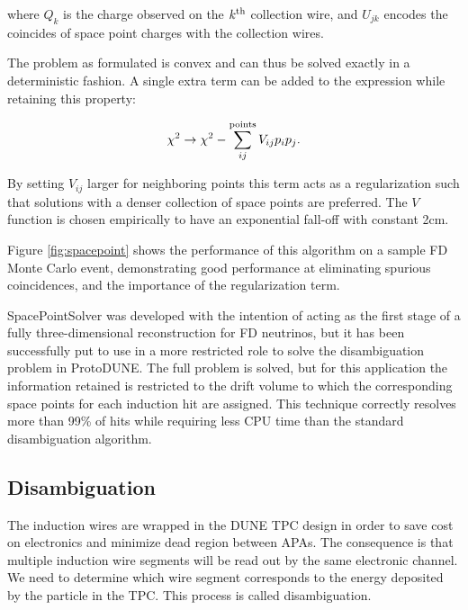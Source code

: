 where $Q_k$ is the charge observed on the $k^{\rm th}$ collection wire, and $U_{jk}$ encodes the coincides of space point charges with the collection wires.

The problem as formulated is convex and can thus be solved exactly in a deterministic fashion. A single extra term can be added to the expression while retaining this property:

\begin{equation}
\chi^2 \to \chi^2 - \sum_{ij}^{\rm points}V_{ij}p_ip_j .
\end{equation}

By setting $V_{ij}$ larger for neighboring points this term acts as a regularization such that solutions with a denser collection of space points are preferred. The $V$ function is chosen empirically to have an exponential fall-off with constant 2cm. %

Figure \ref{fig:spacepoint} shows the performance of this algorithm on a sample FD Monte Carlo event, demonstrating good performance at eliminating spurious coincidences, and the importance of the regularization term.

SpacePointSolver was developed with the intention of acting as the first stage of a fully three-dimensional reconstruction for FD neutrinos, but it has been successfully put to use in a more restricted role to solve the disambiguation problem in ProtoDUNE. The full problem is solved, but for this application the information retained is restricted to the drift volume to which the corresponding space points for each induction hit are assigned. This technique correctly resolves more than 99\% of hits while requiring less CPU time than the standard disambiguation algorithm.

\subsection{Disambiguation}
The induction wires are wrapped in the DUNE TPC design in order to save cost on electronics and minimize dead region between APAs. The consequence is that multiple induction wire segments will be read out by the same electronic channel. We need to determine which wire segment corresponds to the energy deposited by the particle in the TPC. This process is called disambiguation. 

